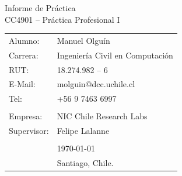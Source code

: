 \documentclass[11pt,letterpaper]{article}
\begin{document}
\newpage
\pagestyle{fancy}
\fancyhf{}
\vspace*{6cm}
\begin{center}
\Huge  {Informe de Práctica}\\
\vspace{1cm}
\small {CC4901 -- Práctica Profesional I}\\
\end{center}
\vfill
\begin{flushright}
\begin{tabular}{ll}
Alumno: & Manuel Olguín\\
Carrera: & Ingeniería Civil en Computación\\
RUT:& 18.274.982 -- 6\\
E-Mail: & molguin@dcc.uchile.cl\\
Tel: & +56 9 7463 6997\\
\\
Empresa: & NIC Chile Research Labs\\
Supervisor: & Felipe Lalanne\\
\\
& \today\\
& Santiago, Chile.
\end{tabular}
\end{flushright}
\end{document}
